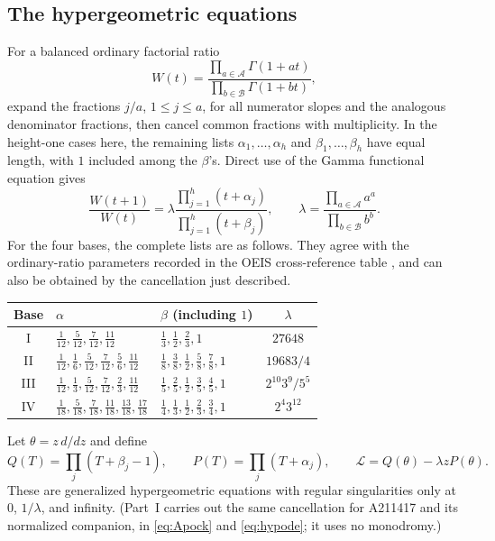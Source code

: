 \documentclass[11pt]{article}
\theoremstyle{definition}
\theoremstyle{remark}
\begin{document}
\subsection{The hypergeometric equations}
For a balanced ordinary factorial ratio
\[
 W(t)=\frac{\prod_{a\in\mathcal A}\Gamma(1+at)}
 {\prod_{b\in\mathcal B}\Gamma(1+bt)},
\]
expand the fractions $j/a$, $1\le j\le a$, for all numerator slopes and the
analogous denominator fractions, then cancel common fractions with
multiplicity. In the height-one cases here, the remaining lists
$\alpha_1,\ldots,\alpha_h$ and $\beta_1,\ldots,\beta_h$ have equal length,
with $1$ included among the $\beta$'s. Direct use of the Gamma functional
equation gives
\begin{equation}
 \frac{W(t+1)}{W(t)}
 =\lambda\frac{\prod_{j=1}^{h}(t+\alpha_j)}
 {\prod_{j=1}^{h}(t+\beta_j)},\qquad
 \lambda=\frac{\prod_{a\in\mathcal A}a^a}
 {\prod_{b\in\mathcal B}b^b}.
 \label{ffd:eq:hyperrec}
\end{equation}
For the four bases, the complete lists are as follows. They agree with the
ordinary-ratio parameters recorded in the OEIS cross-reference table
\cite{ffd-oeis431}, and can also be obtained by the cancellation just described.
\begin{center}
\small\renewcommand{\arraystretch}{1.45}
\begin{tabular}{cllc}
\toprule
Base & $\alpha$ & $\beta$ (including $1$) & $\lambda$\\
\midrule
I&$\frac1{12},\frac5{12},\frac7{12},\frac{11}{12}$
 &$\frac13,\frac12,\frac23,1$ &$27648$\\
II&$\frac1{12},\frac16,\frac5{12},\frac7{12},\frac56,\frac{11}{12}$
 &$\frac18,\frac38,\frac12,\frac58,\frac78,1$ &$19683/4$\\
III&$\frac1{12},\frac13,\frac5{12},\frac7{12},\frac23,\frac{11}{12}$
 &$\frac15,\frac25,\frac12,\frac35,\frac45,1$ &$2^{10}3^9/5^5$\\
IV&$\frac1{18},\frac5{18},\frac7{18},\frac{11}{18},\frac{13}{18},\frac{17}{18}$
 &$\frac14,\frac13,\frac12,\frac23,\frac34,1$ &$2^4 3^{12}$\\
\bottomrule
\end{tabular}
\end{center}
Let $\theta=z\,d/dz$ and define
\begin{equation}
 Q(T)=\prod_j(T+\beta_j-1),\qquad
 P(T)=\prod_j(T+\alpha_j),\qquad
 \mathcal L=Q(\theta)-\lambda zP(\theta).
 \label{ffd:eq:operator}
\end{equation}
These are generalized hypergeometric equations with regular singularities
only at $0$, $1/\lambda$, and infinity. (Part~I carries out the same
cancellation for A211417 and its normalized companion, in
\eqref{eq:Apock} and \eqref{eq:hypode}; it uses no monodromy.)
\end{document}
